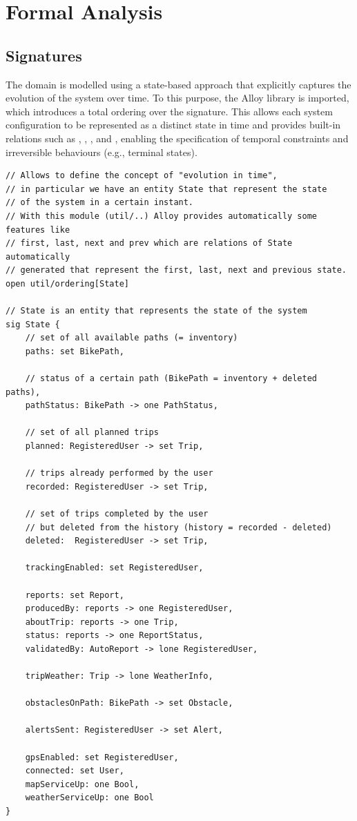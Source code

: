 \section{Formal Analysis}
\subsection{Signatures}
The domain is modelled using a state-based approach that explicitly captures the evolution of the system over time. To this purpose, the Alloy library  is imported, which introduces a total ordering over the  signature. This allows each system configuration to be represented as a distinct state in time and provides built-in relations such as , , , and , enabling the specification of temporal constraints and irreversible behaviours (e.g., terminal states). 

\begin{lstlisting}[caption=State Signature.]
// Allows to define the concept of "evolution in time", 
// in particular we have an entity State that represent the state 
// of the system in a certain instant. 
// With this module (util/..) Alloy provides automatically some features like 
// first, last, next and prev which are relations of State automatically 
// generated that represent the first, last, next and previous state.
open util/ordering[State]

// State is an entity that represents the state of the system
sig State {
    // set of all available paths (= inventory)
    paths: set BikePath,

    // status of a certain path (BikePath = inventory + deleted paths), 
    pathStatus: BikePath -> one PathStatus,

    // set of all planned trips
    planned: RegisteredUser -> set Trip,

    // trips already performed by the user
    recorded: RegisteredUser -> set Trip,	

    // set of trips completed by the user 
    // but deleted from the history (history = recorded - deleted)
    deleted:  RegisteredUser -> set Trip,

    trackingEnabled: set RegisteredUser,

    reports: set Report,
    producedBy: reports -> one RegisteredUser,
    aboutTrip: reports -> one Trip,
    status: reports -> one ReportStatus,
    validatedBy: AutoReport -> lone RegisteredUser,

    tripWeather: Trip -> lone WeatherInfo,

    obstaclesOnPath: BikePath -> set Obstacle,

    alertsSent: RegisteredUser -> set Alert,

    gpsEnabled: set RegisteredUser,
    connected: set User,
    mapServiceUp: one Bool,
    weatherServiceUp: one Bool
}
\end{lstlisting}

